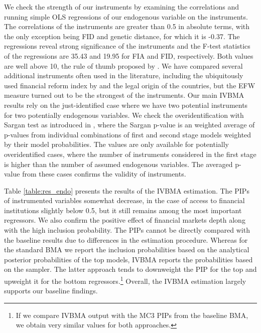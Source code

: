 \documentclass[a4paper,11pt]{article}
\begin{document}
We check the strength of our instruments by examining the correlations and running simple OLS regressions of our endogenous variable on the instruments. The correlations of the instruments are greater than 0.5 in absolute terms, with the only exception being FID and genetic distance, for which it is -0.37. The regressions reveal strong significance of the instruments and the F-test statistics of the regressions are 35.43 and 19.95 for FIA and FID, respectively. Both values are well above 10, the rule of thumb proposed by \citet{staiger1997instrumental}. We have compared several additional instruments often used in the literature, including the ubiquitously used financial reform index by \citet{Abiadetal2008} and the legal origin of the countries, but the \ac{EFW} measure turned out to be the strongest of the instruments. Our main \ac{IVBMA} results rely on the just-identified case where we have two potential instruments for two potentially endogenous variables. We check the overidentification with Sargan test as introduced in \citet{lenkoski2014two}, where the Sargan p-value is an weighted average of p-values from individual combinations of first and second stage models weighted by their model probabilities. The values are only available for potentially overidentified cases, where the number of instruments considered in the first stage is higher than the number of assumed endogenous variables. The averaged p-value from these cases confirms the validity of instruments.

Table \ref{table:res_endo} presents the results of the \ac{IVBMA} estimation. The \acp{PIP} of instrumented variables somewhat decrease, in the case of access to financial institutions slightly below 0.5, but it still remains among the most important regressors. We also confirm the positive effect of financial markets depth along with the high inclusion probability. The \acp{PIP} cannot be directly compared with the baseline results due to differences in the estimation procedure. Whereas for the standard \ac{BMA} we report the inclusion probabilities based on the analytical posterior probabilities of the top models, \ac{IVBMA} reports the probabilities based on the sampler. The latter approach tends to downweight the \ac{PIP} for the top and upweight it for the bottom regressors.\footnote{If we compare \ac{IVBMA} output with the MC3 \acp{PIP} from the baseline \ac{BMA}, we obtain very similar values for both approaches.} Overall, the \ac{IVBMA} estimation largely supports our baseline findings. 
\end{document}
